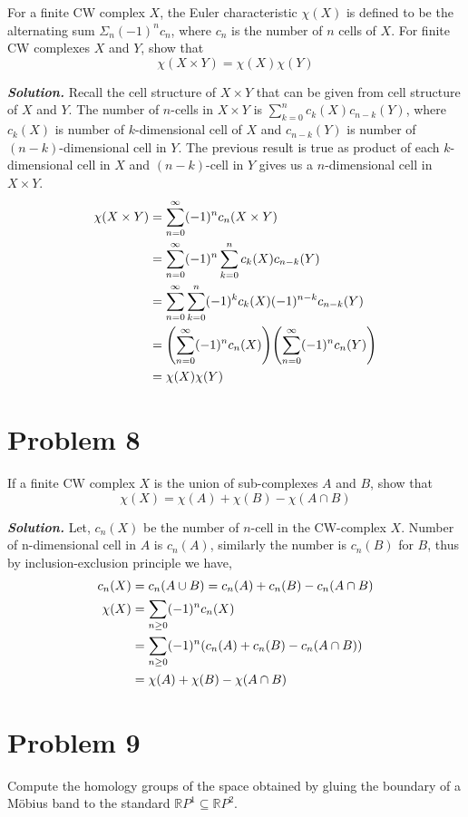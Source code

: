 \documentclass[11pt]{article}
\newcommand{\sol}{ \textbf{\textit{Solution.}} }
\begin{document}
 \begin{prob}{}{}
    For a finite CW complex $X$, the Euler characteristic $\chi(X)$ is defined to be the alternating sum $\Sigma_{n}(-1)^{n} c_{n}$, where $c_{n}$ is the number of $n$ cells of $X$. For finite CW complexes $X$ and $Y$, show that $$\chi(X \times Y)=\chi(X) \chi(Y)$$
 \end{prob}
 \sol Recall the cell structure of $X \times Y$ that can be given from cell structure of $X$ and $Y$. The number of $n$-cells in $X\times  Y$ is $\sum_{k=0}^n c_k(X)c_{n-k}(Y)$, where $c_k(X)$ is number of $k$-dimensional cell of $X$ and $c_{n-k}(Y)$ is number of $(n-k)$-dimensional cell in $Y$. The previous result is true as product of each $k$-dimensional cell in $X$ and $(n-k)$-cell  in $Y$ gives us a $n$-dimensional cell in $X \times Y$. \begin{align*}
    \chi(X \times Y) &= \sum_{n=0}^{\infty}(-1)^n c_n(X \times Y) \\
    &= \sum_{n=0}^{\infty}(-1)^n \sum_{k=0}^{n}c_k(X)c_{n-k}(Y) \\
    &=\sum_{n=0}^{\infty}\sum_{k=0}^{n} (-1)^kc_k(X) (-1)^{n-k}c_{n-k}(Y) \\
    &= \qty(\sum_{n=0}^{\infty}(-1)^nc_n(X)) \qty(\sum_{n=0}^{\infty}(-1)^nc_n(Y))\\
    &= \chi(X) \chi(Y)
 \end{align*}

 \section{Problem 8}
 \begin{prob}{}{}
    If a finite $\mathrm{CW}$ complex $X$ is the union of sub-complexes $A$ and $B$, show that $$\chi(X)=\chi(A)+\chi(B)-\chi(A \cap B)$$
 \end{prob}
 \sol Let, $c_n(X)$ be the number of $n$-cell in the CW-complex $X$. Number of n-dimensional cell in $A$ is $c_n(A)$, similarly the number is $c_n(B)$ for $B$, thus by inclusion-exclusion principle we have, \begin{align*}
    c_n(X)&=c_n(A \cup B) = c_n(A)+c_n(B)-c_n(A \cap B) \\
    \chi(X) &= \sum_{n\geq 0} (-1)^nc_n(X) \\
    &= \sum_{n\geq 0} (-1)^n \qty(c_n(A)+c_n(B)-c_n(A \cap B))\\
    &= \chi(A) + \chi(B) - \chi(A \cap B)
 \end{align*}

 \section{Problem 9}
 \begin{prob}{}{}
    Compute the homology groups of the space obtained by gluing the boundary of a Möbius band to the standard $\mathbb{R} P^{1} \subseteq \mathbb{R} P^{2}$.
 \end{prob}
\end{document}
